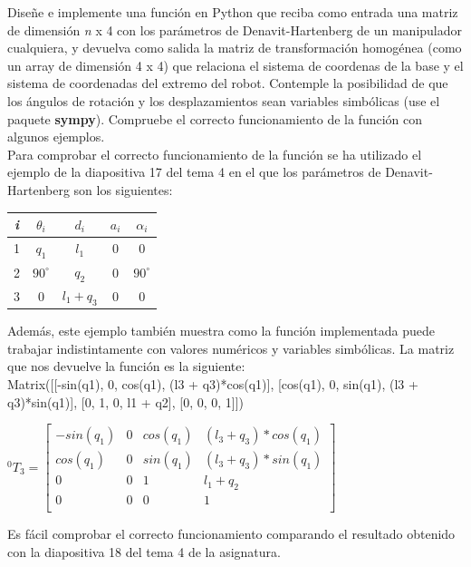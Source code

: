 \documentclass[12pt,a4paper]{report}
\begin{document}

Diseñe e implemente una función en Python que reciba como entrada una matriz de dimensión \textit{n} x 4 con los parámetros de Denavit-Hartenberg de un manipulador cualquiera, y devuelva como salida la matriz de transformación homogénea (como un array de dimensión 4 x 4) que relaciona el sistema de coordenas de la base y el sistema de coordenadas del extremo del robot. Contemple la posibilidad de que los ángulos de rotación y los desplazamientos sean variables simbólicas (use el paquete \textbf{sympy}). Compruebe el correcto funcionamiento de la función con algunos ejemplos.\\

\noindent
Para comprobar el correcto funcionamiento de la función se ha utilizado el ejemplo de la diapositiva 17 del tema 4 en el que los parámetros de Denavit-Hartenberg son los siguientes:

\begin{center}
\begin{tabular}{|c|c|c|c|c|}
    \hline
    \textit{i} & $\theta_i$ & $d_i$ & $a_i$ & $\alpha_i$ \\
    \hline
    1 & $q_1$ & $l_1$ & 0 & 0 \\
    \hline
    2 & $90^\circ$ & $q_2$ & 0 & $90^\circ$ \\
    \hline
    3 & 0 & $l_1 + q_3$ & 0 & 0 \\
    \hline
\end{tabular}
\end{center}
Además, este ejemplo también muestra como la función implementada puede trabajar indistintamente con valores numéricos y variables simbólicas.
La matriz que nos devuelve la función es la siguiente:\\

\noindent
Matrix([[-sin(q1), 0, cos(q1), (l3 + q3)*cos(q1)], [cos(q1), 0, sin(q1), (l3 + q3)*sin(q1)], [0, 1, 0, l1 + q2], [0, 0, 0, 1]])

\begin{center}
    $^0T_3 = 
    \begin{bmatrix}
        -sin(q_1) & 0 & cos(q_1) & (l_3 + q_3)*cos(q_1)\\
        cos(q_1) & 0 & sin(q_1) & (l_3 + q_3)*sin(q_1)\\
        0 & 0 & 1 & l_1 + q_2\\
        0 & 0 & 0 & 1\\
    \end{bmatrix}$ 
\end{center}
Es fácil comprobar el correcto funcionamiento comparando el resultado obtenido con la diapositiva 18 del tema 4 de la asignatura.
\end{document}
